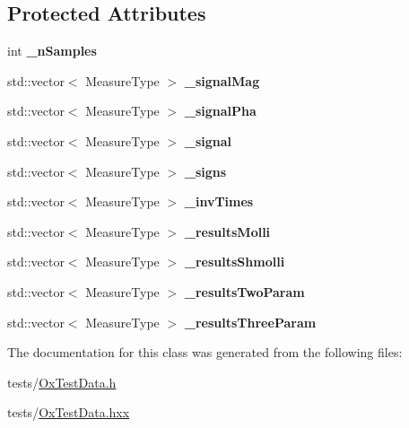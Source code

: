 \subsection*{Protected Attributes}
\begin{DoxyCompactItemize}
\item 
\hypertarget{class_ox_1_1_test_data_a41f65fef5fa534f713cb8a229e5ae14d}{int {\bfseries \-\_\-n\-Samples}}\label{class_ox_1_1_test_data_a41f65fef5fa534f713cb8a229e5ae14d}

\item 
\hypertarget{class_ox_1_1_test_data_a180e0158dc204212fd4879690b2ea3ad}{std\-::vector$<$ Measure\-Type $>$ {\bfseries \-\_\-signal\-Mag}}\label{class_ox_1_1_test_data_a180e0158dc204212fd4879690b2ea3ad}

\item 
\hypertarget{class_ox_1_1_test_data_a5012bab7b7943d05b33151aae38efcc1}{std\-::vector$<$ Measure\-Type $>$ {\bfseries \-\_\-signal\-Pha}}\label{class_ox_1_1_test_data_a5012bab7b7943d05b33151aae38efcc1}

\item 
\hypertarget{class_ox_1_1_test_data_a3d844b169fbdbfcb77d5ef0bf527f554}{std\-::vector$<$ Measure\-Type $>$ {\bfseries \-\_\-signal}}\label{class_ox_1_1_test_data_a3d844b169fbdbfcb77d5ef0bf527f554}

\item 
\hypertarget{class_ox_1_1_test_data_a9e22c4f291064b0c49f7c8007e77b40a}{std\-::vector$<$ Measure\-Type $>$ {\bfseries \-\_\-signs}}\label{class_ox_1_1_test_data_a9e22c4f291064b0c49f7c8007e77b40a}

\item 
\hypertarget{class_ox_1_1_test_data_a4a72325aa7d38c4cac1762a47b7eed1a}{std\-::vector$<$ Measure\-Type $>$ {\bfseries \-\_\-inv\-Times}}\label{class_ox_1_1_test_data_a4a72325aa7d38c4cac1762a47b7eed1a}

\item 
\hypertarget{class_ox_1_1_test_data_a91ae0ccd1b9dea3b83bfc4d7c300dbb0}{std\-::vector$<$ Measure\-Type $>$ {\bfseries \-\_\-results\-Molli}}\label{class_ox_1_1_test_data_a91ae0ccd1b9dea3b83bfc4d7c300dbb0}

\item 
\hypertarget{class_ox_1_1_test_data_ac549cebd93bd96747a68e3680442adfd}{std\-::vector$<$ Measure\-Type $>$ {\bfseries \-\_\-results\-Shmolli}}\label{class_ox_1_1_test_data_ac549cebd93bd96747a68e3680442adfd}

\item 
\hypertarget{class_ox_1_1_test_data_a456aab7444f11ea99dd64a153e4b009c}{std\-::vector$<$ Measure\-Type $>$ {\bfseries \-\_\-results\-Two\-Param}}\label{class_ox_1_1_test_data_a456aab7444f11ea99dd64a153e4b009c}

\item 
\hypertarget{class_ox_1_1_test_data_aeaaf28f493e2add7c05a2418b5ed993d}{std\-::vector$<$ Measure\-Type $>$ {\bfseries \-\_\-results\-Three\-Param}}\label{class_ox_1_1_test_data_aeaaf28f493e2add7c05a2418b5ed993d}

\end{DoxyCompactItemize}


The documentation for this class was generated from the following files\-:\begin{DoxyCompactItemize}
\item 
tests/\hyperlink{_ox_test_data_8h}{Ox\-Test\-Data.\-h}\item 
tests/\hyperlink{_ox_test_data_8hxx}{Ox\-Test\-Data.\-hxx}\end{DoxyCompactItemize}
